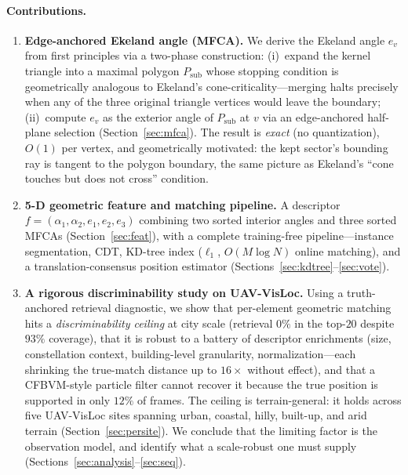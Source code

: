 \documentclass[10pt]{article}
\theoremstyle{plain}
\theoremstyle{definition}
\begin{document}
\paragraph{Contributions.}
\begin{enumerate}
\item \textbf{Edge-anchored Ekeland angle (MFCA).}
      We derive the Ekeland angle $e_v$ from first principles via a two-phase
      construction: (i)~expand the kernel triangle into a maximal polygon
      $P_{\mathrm{sub}}$ whose stopping condition is geometrically analogous
      to Ekeland's cone-criticality---merging halts precisely when any of the
      three original triangle vertices would leave the boundary; (ii)~compute
      $e_v$ as the exterior angle of $P_{\mathrm{sub}}$ at $v$ via an
      edge-anchored half-plane selection (Section~\ref{sec:mfca}).
      The result is \emph{exact} (no quantization), $O(1)$ per vertex, and
      geometrically motivated: the kept sector's bounding ray is tangent to the
      polygon boundary, the same picture as Ekeland's ``cone touches but does
      not cross'' condition.
\item \textbf{5-D geometric feature and matching pipeline.}
      A descriptor $f = (\alpha_1,\alpha_2,e_1,e_2,e_3)$ combining two sorted
      interior angles and three sorted MFCAs (Section~\ref{sec:feat}), with a
      complete training-free pipeline---instance segmentation, CDT, KD-tree
      index ($\ell_1$, $O(M\log N)$ online matching), and a
      translation-consensus position estimator (Sections~\ref{sec:kdtree}--\ref{sec:vote}).
\item \textbf{A rigorous discriminability study on UAV-VisLoc.}
      Using a truth-anchored retrieval diagnostic, we show that per-element
      geometric matching hits a \emph{discriminability ceiling} at city scale
      (retrieval $0\%$ in the top-$20$ despite $93\%$ coverage), that it is
      robust to a battery of descriptor enrichments (size, constellation
      context, building-level granularity, normalization---each shrinking the
      true-match distance up to $16\times$ without effect), and that a
      CFBVM-style particle filter cannot recover it because the true position is
      supported in only $12\%$ of frames. The ceiling is terrain-general: it
      holds across five UAV-VisLoc sites spanning urban, coastal, hilly,
      built-up, and arid terrain (Section~\ref{sec:persite}). We conclude that
      the limiting factor is the observation model, and identify what a
      scale-robust one must supply (Sections~\ref{sec:analysis}--\ref{sec:seq}).

\end{enumerate}
\end{document}
